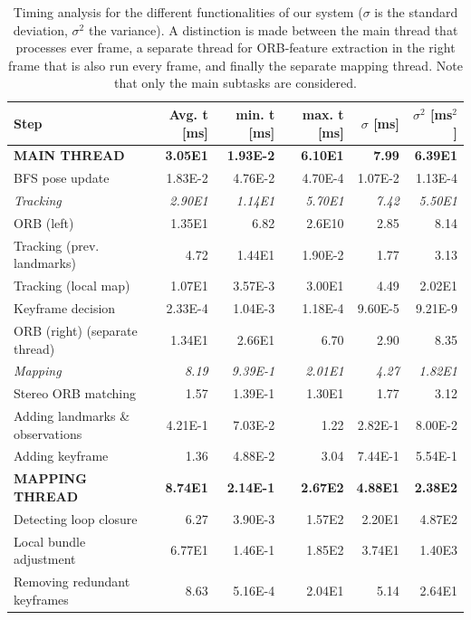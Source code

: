\documentclass[a4paper, 10pt]{article}
\begin{document}
\begin{table}[htbp]
\caption{\label{tab:org66f838d}
Timing analysis for the different functionalities of our system (\(\sigma\) is the standard deviation, \(\sigma^{\text{2}}\) the variance). A distinction is made between the main thread that processes ever frame, a separate thread for ORB-feature extraction in the right frame that is also run every frame, and finally the separate mapping thread. Note that only the main subtasks are considered.}
\centering
\begin{tabular}{lrrrrr}
Step & Avg. t [ms] & min. t [ms] & max. t [ms] & \(\sigma\)  [ms] & \(\sigma^{\text{2}}\) [ms\(^{\text{2}}\)]\\
\hline
\hline
\textbf{MAIN THREAD} & \textbf{3.05E1} & \textbf{1.93E-2} & \textbf{6.10E1} & \textbf{7.99} & \textbf{6.39E1}\\
BFS pose update & 1.83E-2 & 4.76E-2 & 4.70E-4 & 1.07E-2 & 1.13E-4\\
\hline
\emph{Tracking} & \emph{2.90E1} & \emph{1.14E1} & \emph{5.70E1} & \emph{7.42} & \emph{5.50E1}\\
ORB (left) & 1.35E1 & 6.82 & 2.6E10 & 2.85 & 8.14\\
Tracking (prev. landmarks) & 4.72 & 1.44E1 & 1.90E-2 & 1.77 & 3.13\\
Tracking (local map) & 1.07E1 & 3.57E-3 & 3.00E1 & 4.49 & 2.02E1\\
Keyframe decision & 2.33E-4 & 1.04E-3 & 1.18E-4 & 9.60E-5 & 9.21E-9\\
\hline
ORB (right) (separate thread) & 1.34E1 & 2.66E1 & 6.70 & 2.90 & 8.35\\
\hline
\emph{Mapping} & \emph{8.19} & \emph{9.39E-1} & \emph{2.01E1} & \emph{4.27} & \emph{1.82E1}\\
Stereo ORB matching & 1.57 & 1.39E-1 & 1.30E1 & 1.77 & 3.12\\
Adding landmarks \& observations & 4.21E-1 & 7.03E-2 & 1.22 & 2.82E-1 & 8.00E-2\\
Adding keyframe & 1.36 & 4.88E-2 & 3.04 & 7.44E-1 & 5.54E-1\\
\hline
\hline
\textbf{MAPPING THREAD} & \textbf{8.74E1} & \textbf{2.14E-1} & \textbf{2.67E2} & \textbf{4.88E1} & \textbf{2.38E2}\\
Detecting loop closure & 6.27 & 3.90E-3 & 1.57E2 & 2.20E1 & 4.87E2\\
Local bundle adjustment & 6.77E1 & 1.46E-1 & 1.85E2 & 3.74E1 & 1.40E3\\
Removing redundant keyframes & 8.63 & 5.16E-4 & 2.04E1 & 5.14 & 2.64E1\\
\end{tabular}
\end{table}
\end{document}

